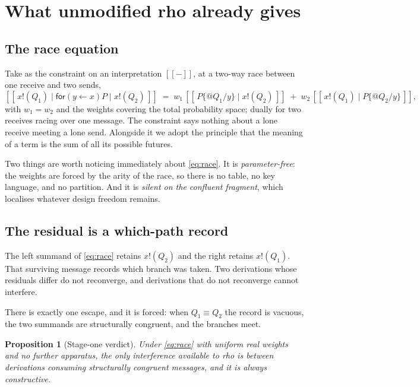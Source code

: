 \documentclass[11pt,a4paper]{article}
\theoremstyle{plain}
\newtheorem{proposition}[theorem]{Proposition}
\theoremstyle{definition}
\theoremstyle{remark}
\newcommand{\sem}[1]{[\![#1]\!]}
\newcommand{\scong}{\equiv}
\begin{document}
\section{What unmodified rho already gives}\label{sec:stage1}

\subsection{The race equation}

Take as the constraint on an interpretation $\sem{-}$, at a two-way race between
one receive and two sends,
\begin{equation}\label{eq:race}
  \sem{\,x!(Q_1) \mid \textsf{for}(y \leftarrow x)P \mid x!(Q_2)\,}
  \;=\;
  w_1\,\sem{\,P\{@Q_1/y\} \mid x!(Q_2)\,}
  \;+\;
  w_2\,\sem{\,x!(Q_1) \mid P\{@Q_2/y\}\,},
\end{equation}
with $w_1 = w_2$ and the weights covering the total probability space; dually for
two receives racing over one message. The constraint says nothing about a lone
receive meeting a lone send. Alongside it we adopt the principle that the meaning
of a term is the sum of all its possible futures.

Two things are worth noticing immediately about \eqref{eq:race}. It is
\emph{parameter-free}: the weights are forced by the arity of the race, so there
is no table, no key language, and no partition. And it is \emph{silent on the
confluent fragment}, which localises whatever design freedom remains.

\subsection{The residual is a which-path record}

The left summand of \eqref{eq:race} retains $x!(Q_2)$ and the right retains
$x!(Q_1)$. That surviving message records which branch was taken. Two derivations
whose residuals differ do not reconverge, and derivations that do not reconverge
cannot interfere.

There is exactly one escape, and it is forced: when $Q_1 \scong Q_2$ the record
is vacuous, the two summands are structurally congruent, and the branches meet.

\begin{proposition}[Stage-one verdict]\label{prop:stage1}
Under \eqref{eq:race} with uniform real weights and no further apparatus, the
only interference available to rho is between derivations consuming
structurally congruent messages, and it is always constructive.
\end{proposition}
\end{document}
